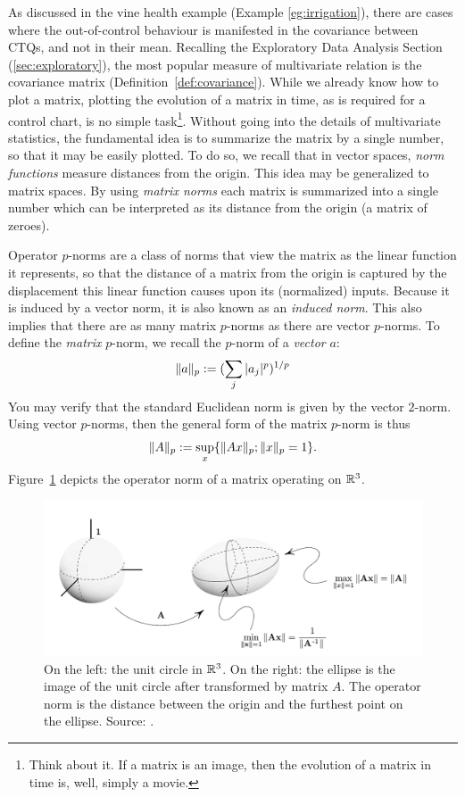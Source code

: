 As discussed in the vine health example (Example \ref{eg:irrigation}), there are cases where the out-of-control behaviour is manifested in the covariance between CTQs, and not in their mean.
Recalling the Exploratory Data Analysis Section (\ref{sec:exploratory}), the most popular measure of multivariate relation is the covariance matrix (Definition~\ref{def:covariance}).
While we already know how to plot a matrix, plotting the evolution of a matrix in time, as is required for a control chart, is no simple task\footnote{Think about it. If a matrix is an image, then the evolution of a matrix in time is, well, simply a movie.}. 
Without going into the details of multivariate statistics, the fundamental idea is to summarize the matrix by a single number, so that it may be easily plotted. 
To do so, we recall that in vector spaces, \emph{norm functions} measure distances from the origin.
This idea may be generalized to matrix spaces. By using \emph{matrix norms} each matrix is summarized into a single number which can be interpreted as its distance from the origin (a matrix of zeroes).

\begin{definition}
Operator $p$-norms are a class of norms that view the matrix as the linear function it represents, so that the distance of a matrix from the origin is captured by the displacement this linear function causes upon its (normalized) inputs.
Because it is induced by a vector norm, it is also known as an \emph{induced norm}.
This also implies that there are as many matrix $p$-norms as there are vector $p$-norms. 
To define the \emph{matrix} $p$-norm, we recall the $p$-norm of a \emph{vector} $a$:
\begin{align}
	\Vert a \Vert_p:= (\sum_j |a_j|^p)^{1/p}
\end{align}
You may verify that the standard Euclidean norm is given by the vector $2$-norm.
Using vector $p$-norms, then the general form of the matrix $p$-norm is thus
\begin{align}
	\Vert A \Vert_p:= \sup_x \{ \Vert Ax \Vert_p; \Vert x \Vert_p=1 \}.
\end{align}
Figure~\ref{fig:operator_norm} depicts the operator norm of a matrix operating on $\mathbb{R}^3$. 
\end{definition}


\begin{figure}
\centering
\includegraphics[width=0.7\linewidth]{art/operator_norm}
\caption{
\footnotesize
On the left: the unit circle in $\mathbb{R}^3$. 
On the right: the ellipse is the image of the unit circle after transformed by matrix $A$. The operator norm is the distance between the origin and the furthest point on the ellipse. 
\newline Source: \cite{meyer_matrix_2001}.}
\label{fig:operator_norm}
\end{figure}

